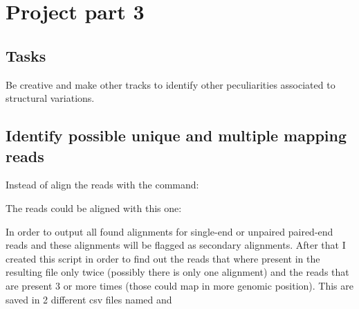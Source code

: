 \chapter{Project part 3}

\section{Tasks}
Be creative and make other tracks to identify other peculiarities associated to
structural variations.

\section{Identify possible unique and multiple mapping reads}
Instead of align the reads with the command:

The reads could be aligned with this one:

In order to output all found alignments for single-end or unpaired paired-end
reads and these alignments will be flagged as secondary alignments.
After that I created this script in order to find out the reads that where
present in the resulting  file only twice (possibly there is only
one alignment) and the reads that are present 3 or more times (those could map
in more genomic position). This are saved in 2 different csv files named
 and 

